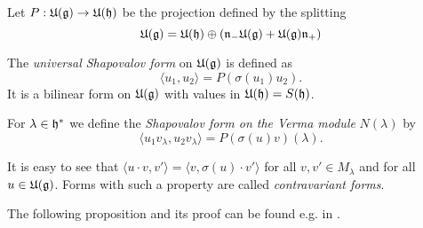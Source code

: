 Let $P: \mathfrak{U(g)} \to \mathfrak{U(h)}$ be the projection defined by the splitting \[\mathfrak{U(g)} = \mathfrak{U(h)}\oplus \left( \mathfrak{n_-U(g)} + \mathfrak{U(g)n_+} \right)\]

\begin{definition}
  The \emph{universal Shapovalov form} on $\mathfrak{U(g)}$ is defined as \[\langle u_1 , u_2 \rangle = P(\sigma(u_1)u_2).\] It is a bilinear form on $\mathfrak{U(g)}$ with values in $\mathfrak{U(h)} = S(\mathfrak{h})$.

  For $\lambda\in\mathfrak{h}^*$ we define the \emph{Shapovalov form on the Verma module} $N(\lambda)$ by \[\langle u_1 v_\lambda , u_2 v_\lambda \rangle = P(\sigma(u)v)(\lambda).\]
\end{definition}

It is easy to see that $\langle u\cdot v,v' \rangle = \langle v,\sigma(u)\cdot v' \rangle$ for all $v,v'\in M_\lambda$ and for all $u\in \mathfrak{U(g)}$. Forms with such a property are called \emph{contravariant forms}.

The following proposition and its proof can be found e.g. in \cite{humphreys_representations_2008}.

